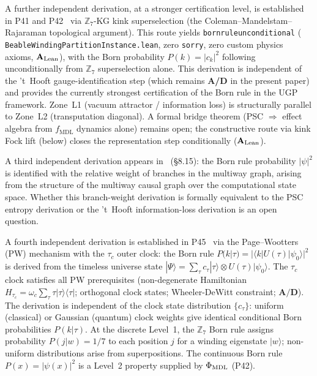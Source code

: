 \documentclass[11pt]{article}
\theoremstyle{remark}
\newcommand{\MDL}{\text{MDL}}
\newcommand{\lean}[1]{%
  \penalty-100
  \begingroup\def\_{\textunderscore\allowbreak}\texttt{#1}\endgroup}
\newcommand{\CatAL}{\ensuremath{\textbf{A}_{\rm Lean}}}
\newcommand{\CatAD}{\textbf{A/D}}
\begin{document}
A further independent derivation, at a stronger certification level, is established
in P41 and P42~\cite{SpivackCMCA,SpivackPhiMDLField} via $\mathbb{Z}_7$-KG kink
superselection (the Coleman--Mandelstam--Rajaraman topological argument).
This route yields \lean{born\_rule\_unconditional} (\lean{BeableWindingPartitionInstance.lean},
zero \texttt{sorry}, zero custom physics axioms, \CatAL{}), with the Born probability
$P(k) = |c_k|^2$ following unconditionally from $\mathbb{Z}_7$ superselection alone.
This derivation is independent of the 't~Hooft gauge-identification step
(which remains \CatAD{} in the present paper) and provides the currently
strongest certification of the Born rule in the UGP framework.
Zone~L1 (vacuum attractor / information loss) is structurally parallel to Zone~L2
(transputation diagonal).
A formal bridge theorem (PSC $\Rightarrow$ effect algebra from $f_{\MDL}$ dynamics alone)
remains open; the constructive route via kink Fock lift (below) closes the
representation step conditionally (\CatAL).

A third independent derivation appears in~\cite{Gorard2020QM} (\S8.15):
the Born rule probability $|\psi|^2$ is identified with the relative
weight of branches in the multiway graph, arising from the structure of
the multiway causal graph over the computational state space.
Whether this branch-weight derivation is formally equivalent to the PSC
entropy derivation or the 't~Hooft information-loss derivation is an
open question.

A fourth independent derivation is established in P45~\cite{SpivackThreeTapeCMCA}
via the Page--Wootters (PW) mechanism with the $\tau_c$ outer clock:
the Born rule $P(k|\tau) = |\langle k|U(\tau)|\psi_0\rangle|^2$ is derived
from the timeless universe state $|\Psi\rangle = \sum_\tau c_\tau|\tau\rangle\otimes U(\tau)|\psi_0\rangle$.
The $\tau_c$ clock satisfies all PW prerequisites (non-degenerate Hamiltonian
$H_{\tau_c} = \omega_c\sum_\tau\tau|\tau\rangle\langle\tau|$; orthogonal clock states;
Wheeler-DeWitt constraint; $\CatAD$). The derivation is independent of the
clock state distribution $\{c_\tau\}$: uniform (classical) or Gaussian (quantum)
clock weights give identical conditional Born probabilities $P(k|\tau)$.
At the discrete Level~1, the $\mathbb{Z}_7$ Born rule assigns probability
$P(j|w) = 1/7$ to each position $j$ for a winding eigenstate $|w\rangle$;
non-uniform distributions arise from superpositions. The continuous Born rule
$P(x) = |\psi(x)|^2$ is a Level~2 property supplied by $\Phi_{\rm MDL}$ (P42).
\end{document}

